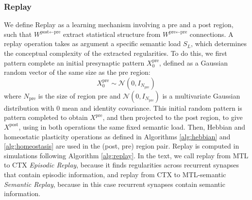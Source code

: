 \documentclass{article}
\begin{document}
\subsubsection*{Replay}
We define \textrm{Replay} as a learning mechanism involving a pre and a post region, such that $W^{\textrm{post}\leftarrow\textrm{pre}}$ extract statistical structure from $W^{\textrm{pre}\leftarrow\textrm{pre}}$ connections. A replay operation takes as argument a specific semantic load $S_L$, which determines the conceptual complexity of the extracted regularities. To do this, we first pattern complete an initial presynaptic pattern $X^\textrm{pre}_0$, defined as a Gaussian random vector of the same size as the pre region:
\begin{equation}
     X^\textrm{pre}_{0} \sim \mathcal{N}(0, I_{N_\textrm{pre}})
\end{equation}
where $N_\textrm{pre}$ is the size of region pre and $\mathcal{N}(0, I_{N_\textrm{pre}})$ is a multivariate Gaussian distribution with 0 mean and identity covariance. This initial random pattern is pattern completed to obtain $X^\textrm{pre}$, and then projected to the post region, to give $X^\textrm{post}$, using in both operations the same fixed semantic load. Then, Hebbian and homeostatic plasticity operations as defined in Algorithms \ref{alg:hebbian} and \ref{alg:homeostasis} are used in the (post, pre) region pair. Replay is computed in simulations following Algorithm \ref{alg:replay}. In the text, we call replay from MTL to CTX \textit{Episodic Replay}, because it finds regularities across recurrent synapses that contain episodic information, and replay from CTX to MTL-semantic \textit{Semantic Replay}, because in this case recurrent synapses contain semantic information.
\end{document}
